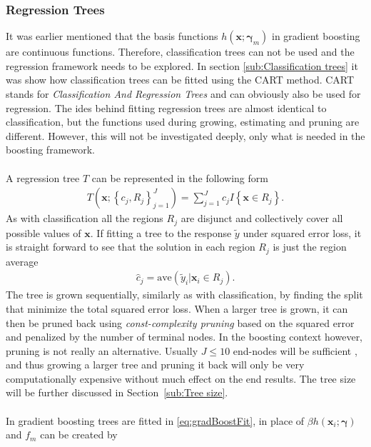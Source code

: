 \subsubsection{Regression Trees}
\label{sub:Regression Trees}
It was earlier mentioned that the basis functions $h(\mathbf{x}; \bm{\gamma}_m)$ in gradient boosting are continuous functions. Therefore, classification trees can not be used and the regression framework needs to be explored.
In section \ref{sub:Classification trees} it was show how classification trees can be fitted using the CART method. CART stands for \textit{Classification And Regression Trees} and can obviously also be used for regression. The ides behind fitting regression trees are almost identical to classification, but the functions used during growing, estimating and pruning are different. However, this will not be investigated deeply, only what is needed in the boosting framework.\\
\\
A regression tree $T$ can be represented in the following form 
\begin{align}
  T(\mathbf{x}; \left\{ c_j, R_j \right\}_{j = 1}^J)  = \sum^{J}_{j=1} c_j I\left\{ \mathbf{x} \in R_j \right\}.
\end{align}
As with classification all the regions $R_j$ are disjunct and collectively cover all possible values of $\mathbf{x}$. If fitting a tree to the response $\tilde y$ under squared error loss, it is straight forward to see that the solution in each region $R_j$ is just the region average
\begin{align}
  \hat{c}_j = \mathrm{ave}(\tilde y_i | \mathbf{x}_i \in R_j).
\end{align}
The tree is grown sequentially, similarly as with classification, by finding the split that minimize the total squared error loss. When a larger tree is grown, it can then be pruned back using \textit{const-complexity pruning} based on the squared error and penalized by the number of terminal nodes. In the boosting context however, pruning is not really an alternative. Usually $J \leq 10$ end-nodes will be sufficient \cite[p.~363]{modstat}, and thus growing a larger tree and pruning it back will only be very computationally expensive without much effect on the end results. The tree size will be further discussed in Section~\ref{sub:Tree size}.\\
\\
In gradient boosting trees are fitted in \eqref{eq:gradBoostFit}, in place of $\beta h(\mathbf{x}_i; \bm{\gamma})$ and $f_m$ can be created by

